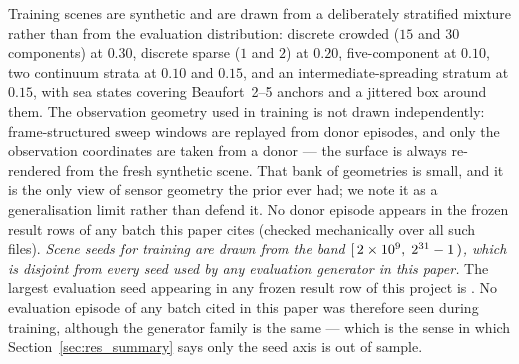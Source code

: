 \documentclass[review]{elsarticle}
\begin{document}
Training scenes are synthetic and are drawn from a deliberately stratified mixture
rather than from the evaluation distribution: discrete crowded ($15$ and $30$
components) at $0.30$, discrete sparse ($1$ and $2$) at $0.20$, five-component at
$0.10$, two continuum strata at $0.10$ and $0.15$, and an intermediate-spreading
stratum at $0.15$, with sea states covering Beaufort~2--5 anchors and a jittered
box around them. The observation geometry used in training is not drawn
independently: frame-structured sweep windows are replayed from \TrainDonors{} donor
episodes, and only the observation coordinates are taken from a donor --- the
surface is always re-rendered from the fresh synthetic scene. That bank of
\TrainDonors{} geometries is small, and it is the only view of sensor geometry the
prior ever had; we note it as a generalisation limit rather than defend it. No donor
episode appears in the frozen result rows of any batch this paper cites (checked
mechanically over all \CitedBatchFiles{} such files).
\emph{Scene seeds for training are drawn from the band
$[\,2\times10^{9}{},\; 2^{31}-1{}\,)$, which is disjoint from every seed used by any
evaluation generator in this paper.} The largest evaluation seed appearing in any
frozen result row of this project is \EvalSeedMax{}. No evaluation episode of any
batch cited in this paper was therefore seen during training, although the generator
family is the same --- which
is the sense in which Section~\ref{sec:res_summary} says only the seed axis is out
of sample.
\end{document}
